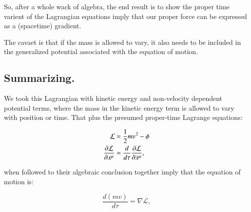 \documentclass{article}      %
\newcommand{\LL}[0]{\mathcal{L}}
\newcommand{\grad}[0]{\nabla}
\newcommand{\PD}[2]{\frac{\partial {#2}}{\partial {#1}}}
\newcommand{\xdot}[0]{\dot{x}}
\begin{document}
So, after a whole wack of algebra, the end result is to show the proper time varient of the Lagrangian equations imply that our 
proper force can be expressed as a (spacetime) gradient.

The cavaet is that if the mass is allowed to vary, it also needs to be
included in the generalized potential associated with the equation of motion.

\subsection{ Summarizing. }

We took this Lagrangian with kinetic energy and non-velocity dependent potential terms, where the
mass in the kinetic energy term is allowed to vary with position or time.  That plus the
presumed proper-time Lagrange equations:

\begin{align*}
\LL &= \inv{2} m v^2 - \phi \\
\PD{x^{\mu}}{\LL} &= \frac{d}{d\tau} \PD{\xdot^{\mu}}{\LL},
\end{align*}

when followed to their algebraic conclusion together imply that the equation of motion is:

\begin{equation*}
\frac{d (m v)}{d\tau} = \grad \LL,
\end{equation*}
\end{document}
